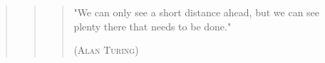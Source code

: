 \clearpage
\begin{flushright}
\mbox{}\vfill

{\sffamily\itshape
	\begin{quote}
		\begin{quote}
			\begin{quotation}
			"We can only see a short distance ahead, but we can see plenty there that needs to be done."\\
			
			\begin{flushright}
			\textsc{(Alan Turing)}
		  	\end{flushright}
		  	
		\end{quotation}
		\end{quote}
	\end{quote}
 }




\end{flushright}
